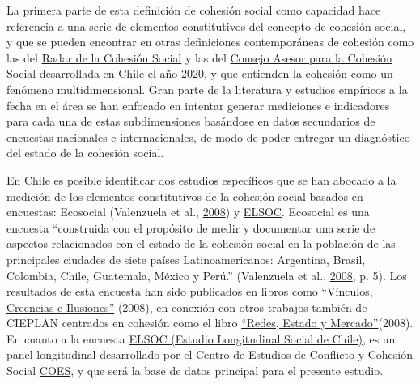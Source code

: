 \documentclass[
  12pt,
]{book}
\begin{document}
La primera parte de esta definición de cohesión social como capacidad hace referencia a una serie de elementos constitutivos del concepto de cohesión social, y que se pueden encontrar en otras definiciones contemporáneas de cohesión como las del \href{https://www.bertelsmann-stiftung.de/en/publications/publication/did/social-cohesion-radar/}{Radar de la Cohesión Social} y las del \href{https://www.desarrollosocialyfamilia.gob.cl/storage/docs/Informe_Final_Consejo_Cohesion_Social.pdf}{Consejo Asesor para la Cohesión Social} desarrollada en Chile el año 2020, y que entienden la cohesión como un fenómeno multidimensional. Gran parte de la literatura y estudios empíricos a la fecha en el área se han enfocado en intentar generar mediciones e indicadores para cada una de estas subdimensiones basándose en datos secundarios de encuestas nacionales e internacionales, de modo de poder entregar un diagnóstico del estado de la cohesión social.

En Chile es posible identificar dos estudios específicos que se han abocado a la medición de los elementos constitutivos de la cohesión social basados en encuestas: Ecosocial (Valenzuela et al., \protect\hyperlink{ref-valenzuela_vinculos_2008}{2008}) y \href{https://coes.cl/encuesta-panel/}{ELSOC}. Ecosocial es una encuesta ``construida con el propósito de medir y documentar una serie de aspectos relacionados con el estado de la cohesión social en la población de las principales ciudades de siete países Latinoamericanos: Argentina, Brasil, Colombia, Chile, Guatemala, México y Perú.'' (Valenzuela et al., \protect\hyperlink{ref-valenzuela_vinculos_2008}{2008}, p. 5). Los resultados de esta encuesta han sido publicados en libros como \href{https://www.cieplan.org/wp-content/uploads/2019/12/Libro_Completo_Vinculos_Creencia_e_Ilusiones.pdf}{``Vínculos, Creencias e Ilusiones''} (2008), en conexión con otros trabajos también de CIEPLAN centrados en cohesión como el libro \href{https://www.cieplan.org/wp-content/uploads/2019/12/Libro_Completo_Redes_Estado_y_Mercado_compressed.pdf}{``Redes, Estado y Mercado''}(2008). En cuanto a la encuesta \href{https://coes.cl/encuesta-panel/}{ELSOC (Estudio Longitudinal Social de Chile)}, es un panel longitudinal desarrollado por el Centro de Estudios de Conflicto y Cohesión Social \href{https://www.coes.cl/}{COES}, y que será la base de datos principal para el presente estudio.
\end{document}
